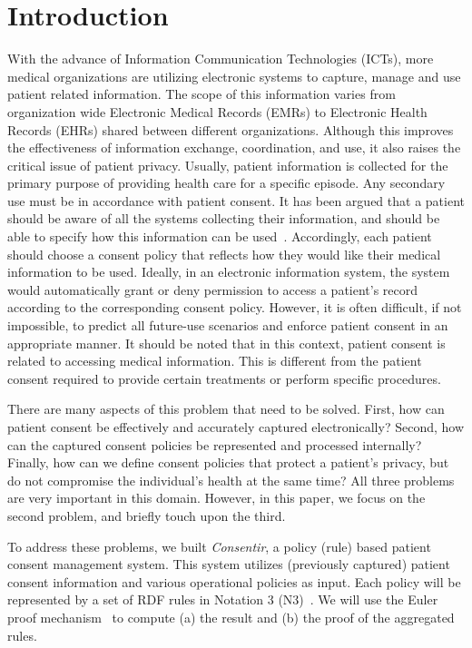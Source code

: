 \documentclass[conference]{IEEEtran}
\begin{document}
\section{Introduction}
With the advance of Information Communication Technologies (ICTs), more medical organizations are utilizing electronic systems to capture, manage and use patient
related information.  The scope of this information varies from organization wide Electronic Medical Records (EMRs) to Electronic Health Records (EHRs) shared
between different organizations.  Although this improves the effectiveness of information exchange, coordination, and use, it also raises the critical issue of
patient privacy. Usually, patient information is collected for the primary purpose of providing health care for a specific episode. Any secondary use must be in
accordance with patient consent.  It has been argued that a patient should be aware of all the systems collecting their information, and should be able to
specify how this information can be used~\cite{kluge2004informed}. Accordingly, each patient should choose a consent policy that reflects how they would like
their medical information to be used. Ideally, in an electronic information system, the system would automatically grant or deny permission to
access a patient's record according to the corresponding consent policy. However, it is often difficult, if not impossible, to predict all future-use scenarios
and enforce patient consent in an appropriate manner. It should be noted that in this context, patient consent is related to accessing medical information.
This is different from the patient consent required to provide certain treatments or perform specific procedures.

There are many aspects of this problem that need to be solved. First, how can patient consent be effectively and accurately captured electronically?
Second, how can the captured consent policies be represented and processed internally? Finally, how can we define consent policies that protect a patient's
privacy, but do not compromise the individual's health at the same time? All three problems are very important in this domain. However, in this paper, we focus on the second problem, and briefly touch upon the third.


To address these problems, we built \textit{Consentir}, a policy (rule) based patient consent management system. This system utilizes (previously
captured) patient consent information and various operational policies as input. Each policy will be represented by a set of RDF rules in Notation 3
(N3)~\cite{N3not}.  We will use the
Euler proof mechanism~\cite{eurlorprf} to compute (a) the result and (b) the proof of the aggregated rules.  
\end{document}
